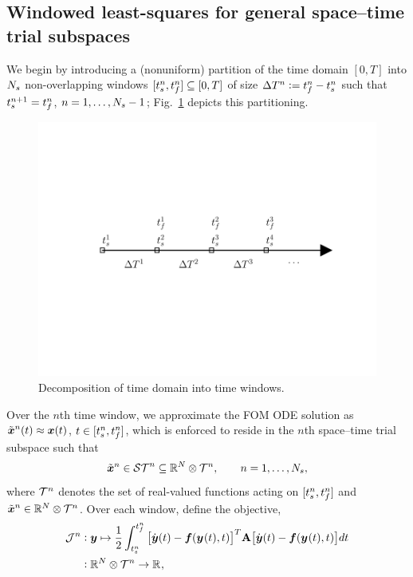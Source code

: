 \subsection{Windowed least-squares for general space--time trial subspaces} 
We begin by introducing a (nonuniform) partition of the time domain $[0,T]$
into $\nslabs$ non-overlapping windows $[\timeStartArg{n} ,
\timeEndArg{n}]\subseteq[0,T]$ of size $\DeltaSlabArg{n}\defeq\timeEndArg{n} -
\timeStartArg{n}$ such that $\timeStartArg{n+1} = \timeEndArg{n}$,
$n=1,\ldots,\nslabs-1$; Fig.~\ref{fig:slab_fig} depicts this partitioning.
\begin{figure} 
\begin{centering} 
\includegraphics[trim={0.0cm 5cm 0cm 3cm},clip,width=1.0\textwidth]{figs/time_grid.pdf} \caption{Decomposition of time
domain into time windows.} \label{fig:slab_fig} \end{centering} 
\end{figure}
Over the $n$th time window, we approximate the FOM ODE solution as 
$\approxstate^n(t)\approx \stateFOM(t)$,
$t\in[\timeStartArg{n},\timeEndArg{n}]$, which is enforced to reside in 
the $n$th space--time trial subspace such that
\begin{equation}
\approxstate^n \in \stspace^n \subseteq \RR{N} \otimes \timeSpaceArg{n} , \qquad  n = 1,\ldots,\nslabs,
\end{equation}
where $\timeSpaceArg{n}$ denotes the set of real-valued functions acting on $[\timeStartArg{n},\timeEndArg{n}]$
and
$\approxstate^n \in\RR{\fomdim}\otimes\timeSpaceArg{n}$. 
Over each window, define the objective,
\begin{equation}\label{eq:obj}
\begin{split} \mathcal{J}^n &\vcentcolon \statey \mapsto
\frac{1}{2} \int_{\timeStartArg{n}}^{\timeEndArg{n}} \big[ \dot{\statey}(t)
- \velocity(\stateyArg{}{t},t) \big]^T \stweightingMatArgt{n}{t} \big[
\dot{\statey}(t) - \velocity(\stateyArg{}{t},t) \big] d t \\
&\vcentcolon \RR{\fomdim}\otimes \timeSpaceArg{n}  \rightarrow
\RR{}, 
\end{split}
\end{equation}
